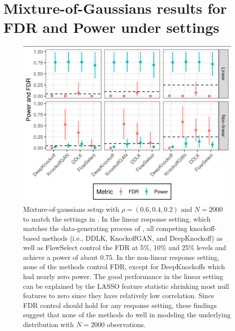 \documentclass{article}
\begin{document}
\section{Mixture-of-Gaussians results for FDR and Power under \citet{sudarshanDeepDirectLikelihood2020} settings}\label{sec:ddlk_settings}

\begin{figure}[!h]
\begin{center}
        \includegraphics[width=0.5\linewidth]{fig/mixture_of_gaussians_ddlk_settings.png}
\end{center}
    \caption{Mixture-of-gaussians setup with \(\rho = (0.6, 0.4, 0.2)\) and \(N=2000\) to match the settings in \citet{sudarshanDeepDirectLikelihood2020}.
In the linear response setting, which matches the data-generating process of \citet{sudarshanDeepDirectLikelihood2020}, all competing knockoff-based methods (i.e., DDLK, KnockoffGAN, and DeepKnockoff) as well as FlowSelect control the FDR at 5\%, 10\% and 25\% levels and achieve a power of about \(0.75\).
In the non-linear response setting, none of the methods control FDR, except for DeepKnockoffs which had nearly zero power.
The good performance in the linear setting can be explained by the LASSO feature statistic shrinking most null features to zero since they have relatively low correlation.
Since FDR control should hold for any response setting, these findings suggest that none of the methods do well in modeling the underlying distribution with $N=2000$ observations.
}
\end{figure}

\newpage
\end{document}
